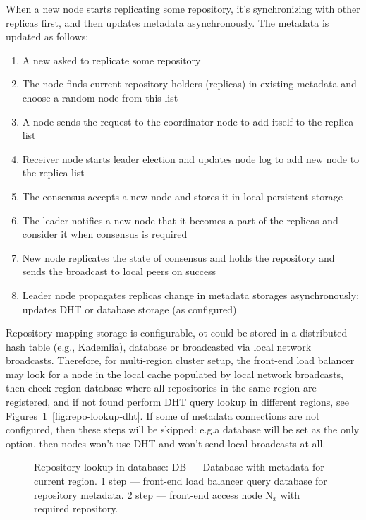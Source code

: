 \documentclass[acmlarge, screen, nonacm, 11pt]{acmart}
\begin{document}
When a new node starts replicating some repository, it's synchronizing
with other replicas first, and then updates metadata asynchronously.
The metadata is updated as follows:
\begin{enumerate}
  \item A new asked to replicate some repository
  \item The node finds current repository holders (replicas) in existing
    metadata and choose a random node from this list
  \item A node sends the request to the coordinator node to add itself
    to the replica list
  \item Receiver node starts leader election and updates node log to add new node to the replica list
  \item The consensus accepts a new node and stores it in local persistent storage
  \item The leader notifies a new node that it becomes a part of the replicas and consider it when consensus is required
  \item New node replicates the state of consensus and holds the repository
    and sends the broadcast to local peers on success
  \item Leader node propagates replicas change in metadata storages asynchronously:
    updates DHT or database storage (as configured)
\end{enumerate}

Repository mapping storage is configurable, ot could be stored in a
distributed hash table (e.g., Kademlia),
database or broadcasted via local network broadcasts.
Therefore, for multi-region cluster setup, the front-end load balancer may
look for a node in the local cache populated by local network broadcasts,
then check region database where all repositories in the same region are
registered, and if not found perform DHT query lookup in different regions,
see Figures~\ref{fig:repo-lookup-db}~\ref{fig:repo-lookup-dht}. If some of
metadata connections are not configured, then these steps will be skipped:
e.g.\@if a database will be set as the only option, then nodes won't use DHT
and won't send local broadcasts at all.

\begin{figure}
  \begin{center}
  \end{center}
  \caption{
    Repository lookup in database:
    DB --- Database with metadata for current region.
    1 step --- front-end load balancer query database for repository metadata.
    2 step --- front-end access node N$_{x}$ with required repository.
  }\label{fig:repo-lookup-db}
\end{figure}
\end{document}
